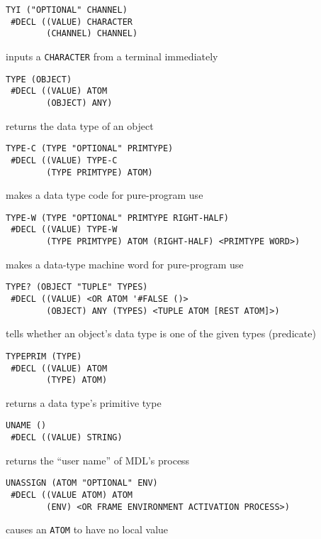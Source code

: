 \documentclass[a4paper]{scrbook}
\begin{document}
\begin{verbatim}
TYI ("OPTIONAL" CHANNEL)
 #DECL ((VALUE) CHARACTER
        (CHANNEL) CHANNEL)
\end{verbatim}

inputs a \texttt{CHARACTER} from a terminal immediately

\begin{verbatim}
TYPE (OBJECT)
 #DECL ((VALUE) ATOM
        (OBJECT) ANY)
\end{verbatim}

returns the data type of an object

\begin{verbatim}
TYPE-C (TYPE "OPTIONAL" PRIMTYPE)
 #DECL ((VALUE) TYPE-C
        (TYPE PRIMTYPE) ATOM)
\end{verbatim}

makes a data type code for pure-program use

\begin{verbatim}
TYPE-W (TYPE "OPTIONAL" PRIMTYPE RIGHT-HALF)
 #DECL ((VALUE) TYPE-W
        (TYPE PRIMTYPE) ATOM (RIGHT-HALF) <PRIMTYPE WORD>)
\end{verbatim}

makes a data-type machine word for pure-program use

\begin{verbatim}
TYPE? (OBJECT "TUPLE" TYPES)
 #DECL ((VALUE) <OR ATOM '#FALSE ()>
        (OBJECT) ANY (TYPES) <TUPLE ATOM [REST ATOM]>)
\end{verbatim}

tells whether an object's data type is one of the given types (predicate)

\begin{verbatim}
TYPEPRIM (TYPE)
 #DECL ((VALUE) ATOM
        (TYPE) ATOM)
\end{verbatim}

returns a data type's primitive type

\begin{verbatim}
UNAME ()
 #DECL ((VALUE) STRING)
\end{verbatim}

returns the ``user name'' of MDL's process

\begin{verbatim}
UNASSIGN (ATOM "OPTIONAL" ENV)
 #DECL ((VALUE ATOM) ATOM
        (ENV) <OR FRAME ENVIRONMENT ACTIVATION PROCESS>)
\end{verbatim}

causes an \texttt{ATOM} to have no local value
\end{document}
